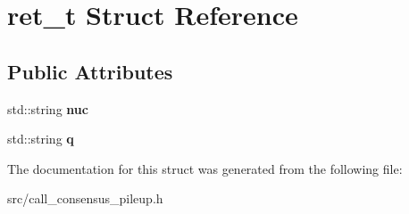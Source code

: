 \hypertarget{structret__t}{}\section{ret\+\_\+t Struct Reference}
\label{structret__t}
\subsection*{Public Attributes}
\begin{DoxyCompactItemize}
\item 
\mbox{\label{structret__t_a168db168b08b1ba42921e902152b6fd1}} 
std\+::string {\bfseries nuc}
\item 
\mbox{\label{structret__t_ac01ffc94dc780b39df879a5cccbc30d6}} 
std\+::string {\bfseries q}
\end{DoxyCompactItemize}


The documentation for this struct was generated from the following file\+:\begin{DoxyCompactItemize}
\item 
src/call\+\_\+consensus\+\_\+pileup.\+h\end{DoxyCompactItemize}
